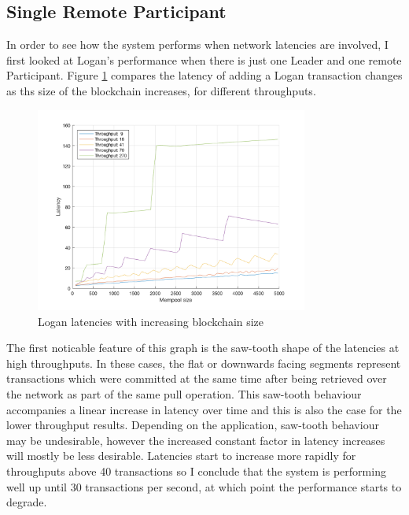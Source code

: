 \documentclass[12pt,a4paper,twoside,openright]{report}
\begin{document}
	\subsection{Single Remote Participant}
	In order to see how the system performs when network latencies are involved, I first looked at Logan's performance when there is just one Leader and one remote Participant.
	Figure \ref{figs:remlatencysize} compares the latency of adding a Logan transaction changes as ths size of the blockchain increases, for different throughputs.
	\begin{figure}
		\centering
		\includegraphics[width=0.8\textwidth]{figs/latencies_sizes_throughputs.png}
		\caption{Logan latencies with increasing blockchain size}
		\label{figs:remlatencysize}
	\end{figure}
	The first noticable feature of this graph is the saw-tooth shape of the latencies at high throughputs.
	In these cases, the flat or downwards facing segments represent transactions which were committed at the same time after being retrieved over the network as part of the same pull operation.
	This saw-tooth behaviour accompanies a linear increase in latency over time and this is also the case for the lower throughput results. 
	Depending on the application, saw-tooth behaviour may be undesirable, however the increased constant factor in latency increases will mostly be less desirable.
	Latencies start to increase more rapidly for throughputs above 40 transactions so I conclude that the system is performing well up until 30 transactions per second, at which point the performance starts to degrade. \\
	
\end{document}
